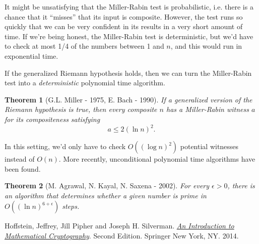 \documentclass[12pt]{article}
\theoremstyle{plain}
\newtheorem{theorem}{Theorem}[section]
\theoremstyle{definition}
\theoremstyle{remark}
\begin{document}
It might be unsatisfying that the Miller-Rabin test is probabilistic, i.e. there is a chance that it ``misses'' that its input is composite.
However, the test runs so quickly that we can be very confident in its results in a very short amount of time.
If we're being honest, the Miller-Rabin test is deterministic, but we'd have to check at most 1/4 of the numbers between 1 and $n$, and this would run in exponential time.

If the generalized Riemann hypothesis holds, then we can turn the Miller-Rabin test into a \emph{deterministic} polynomial time algorithm.
\begin{theorem}[G.L. Miller - 1975, E. Bach - 1990]
    If a generalized version of the Riemann hypothesis is true, then every composite $n$ has a Miller-Rabin witness $a$ for its compositeness satisfying
    \[
        a \leq 2(\ln n)^2.
    \]
\end{theorem}
In this setting, we'd only have to check $O((\log n)^2)$ potential witnesses instead of $O(n)$.
More recently, unconditional polynomial time algorithms have been found.

\begin{theorem}[M. Agrawal, N. Kayal, N. Saxena - 2002]
    For every $\epsilon > 0$, there is an algorithm that determines whether a given number is prime in $O((\ln n)^{6+\epsilon})$ steps.
\end{theorem}


\begin{thebibliography}{13}

 Hoffstein, Jeffrey, Jill Pipher and Joseph H. Silverman. \href{https://link.springer.com/book/10.1007/978-1-4939-1711-2}{\textit{An Introduction to Mathematical Cryptography}}. Second Edition. Springer New York, NY. 2014.



 
\end{thebibliography}
\end{document}
